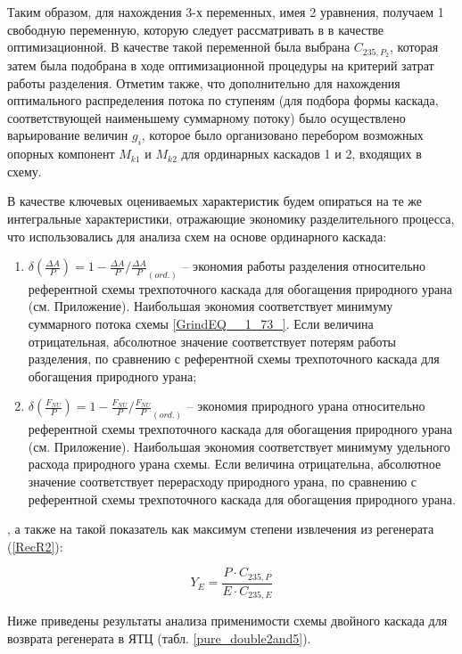Таким образом, для нахождения 3-х переменных, имея 2 уравнения, получаем 1 свободную переменную, которую следует рассматривать в в качестве оптимизационной. В качестве такой переменной была выбрана $C_{235, P_2}$, которая затем была подобрана в ходе оптимизационной процедуры на критерий затрат работы разделения. Отметим также, что дополнительно для нахождения оптимального распределения потока по ступеням (для подбора формы каскада, соответствующей наименьшему суммарному потоку) было осуществлено варьирование величин $g_{i}$, которое было организовано перебором возможных опорных компонент $M_{k1}$ и $M_{k2}$ для ординарных каскадов 1 и 2, входящих в схему.


В качестве ключевых оцениваемых характеристик будем опираться на те же интегральные характеристики, отражающие экономику разделительного процесса, что использовались для анализа схем на основе ординарного каскада:

\begin{enumerate}
  \item $\delta(\frac{\Delta A}{P})=1-\frac{\Delta A}{P}/\frac{\Delta A}{P}_{(ord.)}$ -- экономия работы разделения относительно референтной схемы трехпоточного каскада для обогащения природного урана (см. Приложение). Наибольшая экономия соответствует минимуму суммарного потока схемы \ref{GrindEQ__1_73_}. Если величина отрицательная, абсолютное значение соответствует потерям работы разделения, по сравнению с референтной схемы трехпоточного каскада для обогащения природного урана;
  \item $\delta(\frac{F_{NU}}{P})=1-\frac{F_{NU}}{P}/\frac{F_{NU}}{P}_{(ord.)}$ -- экономия природного урана относительно референтной схемы трехпоточного каскада для обогащения природного урана (см. Приложение).  Наибольшая экономия соответствует минимуму удельного расхода природного урана схемы. Если величина отрицательна, абсолютное значение соответствует перерасходу природного урана, по сравнению с референтной схемы трехпоточного каскада для обогащения природного урана.
\end{enumerate}

, а также на такой показатель как максимум степени извлечения из регенерата (\ref{RecR2}):

\begin{equation} \label{RecR2} 
    Y_{E} = \frac{P\cdot C_{235,P}}{E \cdot C_{235,E}}        
\end{equation} 

Ниже приведены результаты анализа применимости схемы двойного каскада для возврата регенерата в ЯТЦ (табл. \ref{pure_double2and5}).\\


